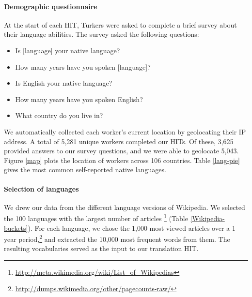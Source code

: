\documentclass[11pt]{article}
\begin{document}
\paragraph{Demographic questionnaire}

At the start of each HIT, Turkers were asked to complete a brief survey about their language abilities. The survey asked the following questions:
\begin{itemize}
\item Is [language] your native language? 
\item How many years have you spoken [language]? 
\item Is English your native language? 
\item How many years have you spoken English?
\item What country do you live in?
\end{itemize}
We automatically collected each worker's current location by geolocating their IP address.  A total of 5,281 unique workers completed our HITs. Of these, 3,625 provided answers to our survey questions, and we were able to geolocate 5,043. Figure \ref{map} plots the location of workers across 106 countries.  Table \ref{lang-pie} gives the most common self-reported native languages. 

\paragraph{Selection of languages}

We drew our data from the different language versions of Wikipedia.   We selected the 100 languages with the largest number of articles \footnote{\url{http://meta.wikimedia.org/wiki/List_of_Wikipedias}} (Table \ref{Wikipedia-buckets}). For each language, we chose the 1,000 most viewed articles over a 1 year period,\footnote{\url{http://dumps.wikimedia.org/other/pagecounts-raw/}} and extracted the 10,000 most frequent words from them. The resulting vocabularies served as the input to our translation HIT.
\end{document}
